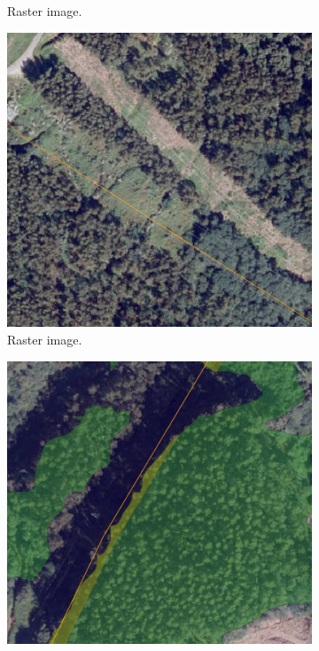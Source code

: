\begin{figure}[H]
\begin{subfigure}{0.328\textwidth}
\caption{Raster image.}
\label{fig:right}
\end{subfigure}
\begin{subfigure}{0.305\textwidth}
\centering
\includegraphics[width = \textwidth]{IMAGENES/Intersection3.png}
\caption{Raster image.}
\label{fig:left}
\end{subfigure}
\begin{subfigure}{0.31\textwidth}
\centering
\includegraphics[width = \textwidth]{IMAGENES/Intersection1-m.png}

\end{subfigure}
\end{figure}
